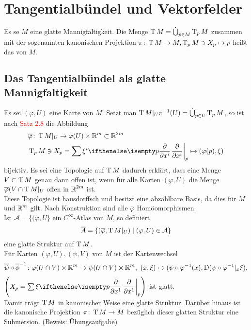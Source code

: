 
\section{Tangentialbündel und Vektorfelder}

\begin{dfn}[Tangentialbündel]
  Es se $M$ eine glatte Mannigfaltigkeit. Die Menge $\operatorname{T} M = \dot \bigcup_{p \in M}\operatorname{T}_pM$ zusammen mit der sogenannten kanonischen Projektion $\pi \colon \operatorname{T} M \to M, \operatorname{T}_pM \ni X_p \mapsto p$ heißt das  von $M$.
\end{dfn}

\subsection{Das Tangentialbündel als glatte Mannigfaltigkeit}

Es sei $(\varphi, U)$ eine Karte von $M$. Setzt man $\operatorname{T} M|_U  \pi^{-1}(U) = \dot \bigcup_{p\in U}\operatorname{T}_pM$, so ist nach \textcolor{red}{Satz 2.8} %
die Abbildung
\begin{align*}
  & \overline \varphi \colon \T M|_U \to \varphi(U) \times \R^m \subset \R^{2m}\\
  &\T_p M \ni X_p = \sum \xi^i\pdifffrac[p]{}{x^i} \mapsto (\varphi(p),\xi)
\end{align*}
bijektiv.
Es sei eine Topologie auf $\operatorname{T} M$ dadurch erklärt, dass eine Menge $V \subset \operatorname{T} M$ genau dann offen ist, wenn für alle Karten $(\varphi, U)$ die Menge $\overline \varphi(V \cap \operatorname{T} M|_U$ offen in $\operatorname{\mathbb{R}}^{2m}$ ist.\\
Diese Topologie ist hausdorffsch und besitzt eine abzählbare Basis, da dies für $M$ und $\operatorname{\mathbb{R}}^m$ gilt.
Nach Konstruktion sind alle $\overline \varphi$ Homöomorphismen.\\
Ist $\mathcal A = \{(\varphi, U\}$ ein $C^{\infty}$-Atlas von $M$, so definiert
\begin{align*}
  \overline A = \{(\overline \varphi, \operatorname{T} M|_U) \mid (\varphi, U) \in \mathcal A\}
\end{align*}
eine glatte Struktur auf $\operatorname{T} M$.\\
Für Karten $(\varphi, U), (\psi, V)$ von $M$ ist der Kartenwechsel
\begin{align*}
  \overline \psi \circ \overline \phi^{-1} \colon \varphi(U \cap V) \times \operatorname{\mathbb{R}}^m \to \psi(U \cap V) \times \operatorname{\mathbb{R}}^m, \ (x, \xi) \mapsto (\psi \circ \varphi^{-1}(x),\operatorname{D}(\psi \circ \varphi^{-1}|_x\xi),
\end{align*}
$\left(X_p = \sum \xi \pdifffrac[p]{}{x^1}\right)$ ist glatt.\\
Damit trägt $\operatorname{T} M$ in kanonischer Weise eine glatte Struktur.
Darüber hinaus ist die kanonische Projektion $\pi \colon \operatorname{T} M \to M$ bezüglich dieser glatten Struktur eine Submersion. (Beweis: Übungsaufgabe)\\

